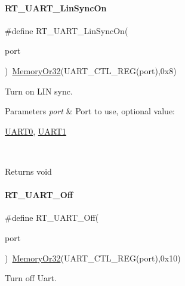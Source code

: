 \paragraph{\texorpdfstring{R\+T\+\_\+\+U\+A\+R\+T\+\_\+\+Lin\+Sync\+On}{RT\_UART\_LinSyncOn}}
{\footnotesize\ttfamily \#define R\+T\+\_\+\+U\+A\+R\+T\+\_\+\+Lin\+Sync\+On(\begin{DoxyParamCaption}\item[{}]{port }\end{DoxyParamCaption})~\mbox{\hyperlink{a00026_a27874a97deab7cecdde5ddecf466e31e}{Memory\+Or32}}(U\+A\+R\+T\+\_\+\+C\+T\+L\+\_\+\+R\+EG(port),0x8)}



Turn on L\+IN sync. 


\begin{DoxyParams}{Parameters}
{\em port} & Port to use, optional value\+:
\begin{DoxyCode}
\mbox{\hyperlink{a00098_a0508661f121639ffdee7de2353a0def2}{UART0}}, \mbox{\hyperlink{a00098_a8d69bf04d07af4fbbab5a8bd291f65ff}{UART1}}
\end{DoxyCode}
 \\
\hline
\end{DoxyParams}
\begin{DoxyReturn}{Returns}
void 
\end{DoxyReturn}
\mbox{\label{a00098_a60de547d761052a56b69e4a75493b831}} 
\paragraph{\texorpdfstring{R\+T\+\_\+\+U\+A\+R\+T\+\_\+\+Off}{RT\_UART\_Off}}
{\footnotesize\ttfamily \#define R\+T\+\_\+\+U\+A\+R\+T\+\_\+\+Off(\begin{DoxyParamCaption}\item[{}]{port }\end{DoxyParamCaption})~\mbox{\hyperlink{a00026_a27874a97deab7cecdde5ddecf466e31e}{Memory\+Or32}}(U\+A\+R\+T\+\_\+\+C\+T\+L\+\_\+\+R\+EG(port),0x10)}



Turn off Uart. 


